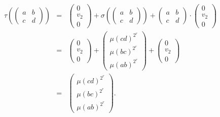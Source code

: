 \begin{eqnarray*}
\tau\left(
\left(\begin{matrix} a & b \\ c & d\end{matrix}\right)
\right) 
&=&
\left(\begin{matrix} 0 \\ v_2 \\ 0 \end{matrix}\right) +
\sigma\left(
\left(\begin{matrix} a & b \\ c & d\end{matrix}\right)
\right) 
+\left(\begin{matrix} a & b \\ c & d\end{matrix}\right)\cdot \left(\begin{matrix} 0 \\ v_2 \\ 0 \end{matrix}\right) \\
&=&
\left(\begin{matrix} 0 \\ v_2 \\ 0 \end{matrix}\right) +
\left(\begin{matrix} \mu(cd)^{2^r} \\ \mu(bc)^{2^r} \\ \mu(ab)^{2^r} \end{matrix}\right)
+\left(\begin{matrix} 0 \\ v_2 \\ 0 \end{matrix}\right) \\
&=&\left(\begin{matrix}  \mu(cd)^{2^r} \\ \mu(bc)^{2^r} \\ \mu(ab)^{2^r} \end{matrix}\right).
\end{eqnarray*}

